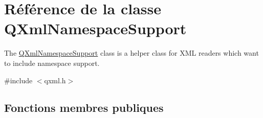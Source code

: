 \hypertarget{class_q_xml_namespace_support}{}\section{Référence de la classe Q\+Xml\+Namespace\+Support}
\label{class_q_xml_namespace_support}


The \hyperlink{class_q_xml_namespace_support}{Q\+Xml\+Namespace\+Support} class is a helper class for X\+M\+L readers which want to include namespace support.  




{\ttfamily \#include $<$qxml.\+h$>$}

\subsection*{Fonctions membres publiques}
